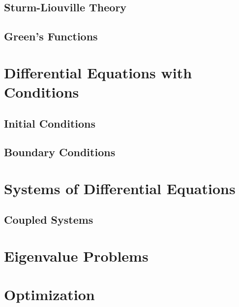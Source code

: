 \documentclass{report}
\begin{document}
        \subsection{Sturm-Liouville Theory}

        \subsection{Green's Functions}

    \section{Differential Equations with Conditions}

        \subsection{Initial Conditions}

        \subsection{Boundary Conditions}


    \section{Systems of Differential Equations}

        \subsection{Coupled Systems}

    \section{Eigenvalue Problems}

    \section{Optimization}
\end{document}
